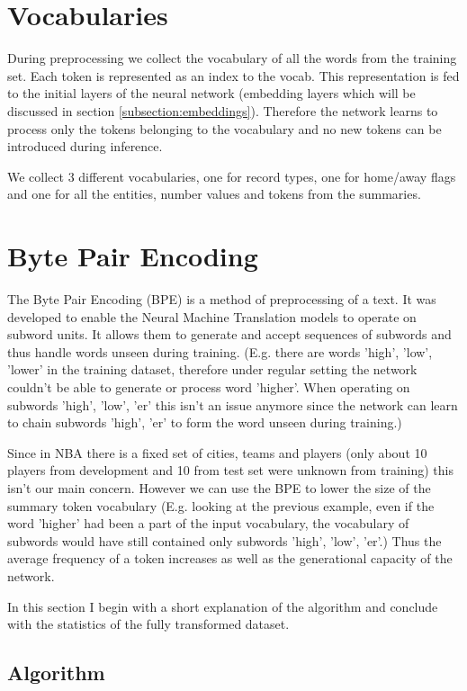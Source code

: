 \section{Vocabularies}

During preprocessing we collect the vocabulary of all the words from the training set. Each token is represented as an index to the vocab. This representation is fed to the initial layers of the neural network (embedding layers which will be discussed in section \ref{subsection:embeddings}). Therefore the network learns to process only the tokens belonging to the vocabulary and no new tokens can be introduced during inference.

We collect 3 different vocabularies, one for record types, one for home/away flags and one for all the entities, number values and tokens from the summaries.

\section{Byte Pair Encoding} \label{bpeSection}

The Byte Pair Encoding (BPE) \citep{sennrich2016} is a method of preprocessing of a text. It was developed to enable the Neural Machine Translation models to operate on subword units. It allows them to generate and accept sequences of subwords and thus handle words unseen during training. (E.g. there are words 'high', 'low', 'lower' in the training dataset, therefore under regular setting the network couldn't be able to generate or process word 'higher'. When operating on subwords 'high', 'low', 'er' this isn't an issue anymore since the network can learn to chain subwords 'high', 'er' to form the word unseen during training.)

Since in NBA there is a fixed set of cities, teams and players (only about 10 players from development and 10 from test set were unknown from training) this isn't our main concern. However we can use the BPE to lower the size of the summary token vocabulary (E.g. looking at the previous example, even if the word 'higher' had been a part of the input vocabulary, the vocabulary of subwords would have still contained only subwords 'high', 'low', 'er'.) Thus the average frequency of a token increases as well as the generational capacity of the network.

In this section I begin with a short explanation of the algorithm and conclude with the statistics of the fully transformed dataset.

\subsection{Algorithm}

